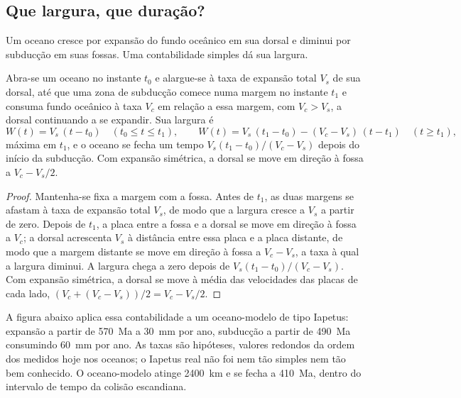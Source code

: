 \subsection{Que largura, que duração?}

Um oceano cresce por expansão do fundo oceânico em sua dorsal e diminui por subducção em suas fossas.
Uma contabilidade simples dá sua largura.

\begin{proposition}\label{prop:b2:wilson-cycle:width}
Abra-se um oceano no instante $t_0$ e alargue-se à taxa de expansão total $V_s$ de sua dorsal, até que uma
zona de subducção comece numa margem no instante $t_1$ e consuma fundo oceânico à taxa $V_c$
em relação a essa margem, com $V_c > V_s$, a dorsal continuando a se expandir. Sua largura é
\[
  W(t) = V_s\,(t - t_0) \quad (t_0 \le t \le t_1), \qquad
  W(t) = V_s\,(t_1 - t_0) - (V_c - V_s)\,(t - t_1) \quad (t \ge t_1),
\]
máxima em $t_1$, e o oceano se fecha um tempo $V_s(t_1 - t_0)/(V_c - V_s)$ depois do início da
subducção. Com expansão simétrica, a dorsal se move em direção à fossa a $V_c - V_s/2$.
\end{proposition}

\begin{proof}
Mantenha-se fixa a margem com a fossa. Antes de $t_1$, as duas margens se afastam à taxa de expansão
total $V_s$, de modo que a largura cresce a $V_s$ a partir de zero. Depois de $t_1$, a placa entre a
fossa e a dorsal se move em direção à fossa a $V_c$; a dorsal acrescenta $V_s$ à distância
entre essa placa e a placa distante, de modo que a margem distante se move em direção à fossa a $V_c - V_s$,
a taxa à qual a largura diminui. A largura chega a zero depois de $V_s(t_1 - t_0)/(V_c -
V_s)$. Com expansão simétrica, a dorsal se move à média das velocidades das placas de
cada lado, $(V_c + (V_c - V_s))/2 = V_c - V_s/2$.
\end{proof}

A figura abaixo aplica essa contabilidade a um oceano-modelo de tipo Iapetus: expansão a partir de
\qty{570}{Ma} a \qty{30}{mm} por ano, subducção a partir de \qty{490}{Ma} consumindo \qty{60}{mm} por
ano. As taxas são hipóteses, valores redondos da ordem dos medidos hoje nos oceanos; o
Iapetus real não foi nem tão simples nem tão bem conhecido. O oceano-modelo atinge \qty{2400}{km}
e se fecha a \qty{410}{Ma}, dentro do intervalo de tempo da colisão escandiana.

